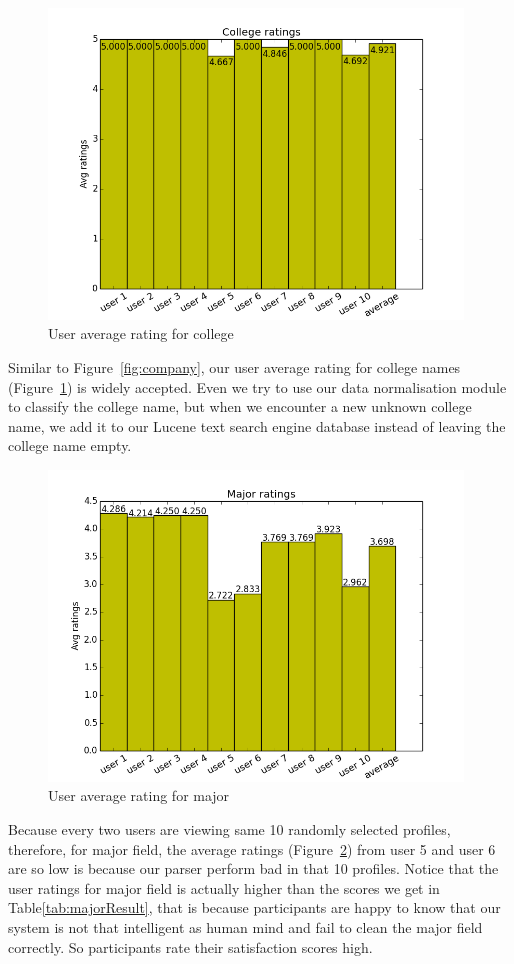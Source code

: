 \begin{figure}[H]
\centering
\includegraphics[width=110mm]{images/evaluation/average_college_score.png}
\caption{User average rating for college}
\label{fig:college}
\end{figure}

Similar to Figure~\ref{fig:company}, our user average rating for college names (Figure~\ref{fig:college}) is widely accepted. Even we try to use our data normalisation module to classify the college name, but when we encounter a new unknown college name, we add it to our Lucene text search engine database instead of leaving the college name empty.

\begin{figure}[H]
\centering
\includegraphics[width=110mm]{images/evaluation/average_major_score.png}
\caption{User average rating for major}
\label{fig:major}
\end{figure}

Because every two users are viewing same 10 randomly selected profiles, therefore, for major field, the average ratings (Figure~\ref{fig:major}) from user 5 and user 6 are so low is because our parser perform bad in that 10 profiles. Notice that the user ratings for major field is actually higher than the scores we get in Table\ref{tab:majorResult}, that is because participants are happy to know that our system is not that intelligent as human mind and fail to clean the major field correctly. So participants rate their satisfaction scores high.

